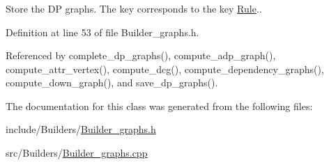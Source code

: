 \hypertarget{classgenevalmag_1_1Builder__graphs_a2f001cd797840683731d524214cd6d13}{
\subsubsection[{p\_\-Dp\_\-graphs}]{}}
\label{classgenevalmag_1_1Builder__graphs_a2f001cd797840683731d524214cd6d13}


Store the DP graphs. The key corresponds to the key \hyperlink{classgenevalmag_1_1Rule}{Rule}.. 



Definition at line 53 of file Builder\_\-graphs.h.



Referenced by complete\_\-dp\_\-graphs(), compute\_\-adp\_\-graph(), compute\_\-attr\_\-vertex(), compute\_\-dcg(), compute\_\-dependency\_\-graphs(), compute\_\-down\_\-graph(), and save\_\-dp\_\-graphs().



The documentation for this class was generated from the following files:\begin{DoxyCompactItemize}
\item 
include/Builders/\hyperlink{Builder__graphs_8h}{Builder\_\-graphs.h}\item 
src/Builders/\hyperlink{Builder__graphs_8cpp}{Builder\_\-graphs.cpp}\end{DoxyCompactItemize}
